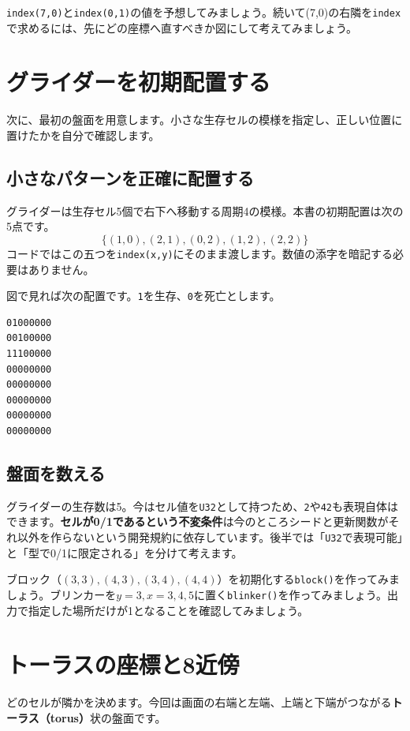 \documentclass[11pt,a4paper,openany]{book}
\newcommand{\code}[1]{\texttt{#1}}
\newcommand{\term}[1]{\textbf{#1}}
\newcommand{\readcode}[2]{}
\newcommand{\exercise}[1]{\begin{exercisebox}#1\end{exercisebox}}
\begin{document}
\exercise{\code{index(7,0)}と\code{index(0,1)}の値を予想してみましょう。続いて(7,0)の右隣を\code{index}で求めるには、先にどの座標へ直すべきか図にして考えてみましょう。}

\chapter{グライダーを初期配置する}
\begin{tcolorbox}[colback=blue!3,colframe=blue!16,boxrule=.35pt,arc=1mm,left=3mm,right=3mm,top=2mm,bottom=2mm]
\small 次に、最初の盤面を用意します。小さな生存セルの模様を指定し、正しい位置に置けたかを自分で確認します。
\end{tcolorbox}

\section{小さなパターンを正確に配置する}
グライダーは生存セル5個で右下へ移動する周期4の模様。本書の初期配置は次の5点です。\[\{(1,0),(2,1),(0,2),(1,2),(2,2)\}\]コードではこの五つを\code{index(x,y)}にそのまま渡します。数値の添字を暗記する必要はありません。

\readcode{05_glider.bend}{初期グライダー（05\_glider.bend）}
図で見れば次の配置です。\code{1}を生存、\code{0}を死亡とします。
\begin{lstlisting}[language={},numbers=none,caption={世代0の配置（8列×8行）}]
01000000
00100000
11100000
00000000
00000000
00000000
00000000
00000000
\end{lstlisting}
\section{盤面を数える}
グライダーの生存数は5。今はセル値を\code{U32}として持つため、\code{2}や\code{42}も表現自体はできます。\textbf{セルが0/1であるという不変条件}は今のところシードと更新関数がそれ以外を作らないという開発規約に依存しています。後半では「\code{U32}で表現可能」と「型で0/1に限定される」を分けて考えます。

\exercise{ブロック（\((3,3),(4,3),(3,4),(4,4)\)）を初期化する\code{block()}を作ってみましょう。ブリンカーを\(y=3,x=3,4,5\)に置く\code{blinker()}を作ってみましょう。出力で指定した場所だけが1となることを確認してみましょう。}

\chapter{トーラスの座標と8近傍}
\begin{tcolorbox}[colback=blue!3,colframe=blue!16,boxrule=.35pt,arc=1mm,left=3mm,right=3mm,top=2mm,bottom=2mm]
\small どのセルが隣かを決めます。今回は画面の右端と左端、上端と下端がつながる\term{トーラス（torus）}状の盤面です。
\end{tcolorbox}
\end{document}
